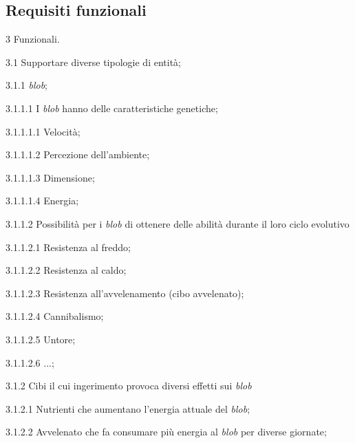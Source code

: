 \subsection{Requisiti funzionali}

\begin{myEnumerate}
    \item[3] Funzionali.
    \begin{myEnumerate}[label*=\arabic*.]
        \item[3.1] Supportare diverse tipologie di entità;
	\begin{myEnumerate}[label*=\arabic*.]
        	\item[3.1.1] \textit{blob};
		\begin{myEnumerate}[label*=\arabic*.]
        		\item[3.1.1.1] I \textit{blob} hanno delle caratteristiche genetiche;
			\begin{myEnumerate}[label*=\arabic*.]
        			\item[3.1.1.1.1] Velocità;
				\item[3.1.1.1.2] Percezione dell'ambiente;
				\item[3.1.1.1.3] Dimensione;
				\item[3.1.1.1.4] Energia;
    			\end{myEnumerate}
			\item[3.1.1.2] Possibilità per i \textit{blob} di ottenere delle abilità durante il loro ciclo evolutivo
			\begin{myEnumerate}[label*=\arabic*.]
        			\item[3.1.1.2.1] Resistenza al freddo;
				\item[3.1.1.2.2] Resistenza al caldo;
				\item[3.1.1.2.3] Resistenza all'avvelenamento (cibo avvelenato);
				\item[3.1.1.2.4] Cannibalismo;
				\item[3.1.1.2.5] Untore;
				\item[3.1.1.2.6] ...;
    			\end{myEnumerate}
    		\end{myEnumerate}
		\item[3.1.2] Cibi il cui ingerimento provoca diversi effetti sui \textit{blob}
		\begin{myEnumerate}[label*=\arabic*.]
        		\item[3.1.2.1] Nutrienti che aumentano l'energia attuale del \textit{blob};
			\item[3.1.2.2] Avvelenato che fa consumare più energia al \textit{blob} per diverse giornate;

\end{myEnumerate}
\end{myEnumerate}
\end{myEnumerate}
\end{myEnumerate}
